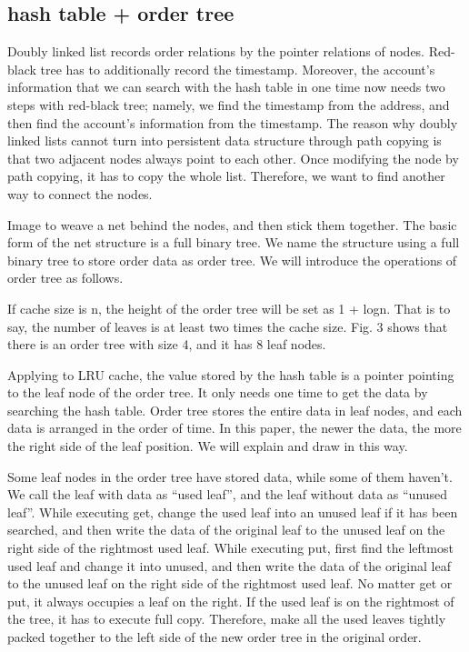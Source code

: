 \documentclass[conference]{IEEEtran}
\begin{document}
\subsection{hash table + order tree}
Doubly linked list records order relations by the pointer relations of nodes. Red-black tree has to additionally record the timestamp. Moreover, the account’s information that we can search with the hash table in one time now needs two steps with red-black tree; namely, we find the timestamp from the address, and then find the account's information from the timestamp.
The reason why doubly linked lists cannot turn into persistent data structure through path copying is that two adjacent nodes always point to each other. Once modifying the node by path copying, it has to copy the whole list. Therefore, we want to find another way to connect the nodes.

Image to weave a net behind the nodes, and then stick them together.
The basic form of the net structure is a full binary tree. We name the structure using a full binary tree to store order data as order tree. We will introduce the operations of order tree as follows.

If cache size is n, the height of the order tree will be set as 1 + logn. That is to say, the number of leaves is at least two times the cache size. Fig. 3 shows that there is an order tree with size 4, and it has 8 leaf nodes.

Applying to LRU cache, the value stored by the hash table is a pointer pointing to the leaf node of the order tree. It only needs one time to get the data by searching the hash table. 
Order tree stores the entire data in leaf nodes, and each data is arranged in the order of time. In this paper, the newer the data, the more the right side of the leaf position. We will explain and draw in this way.

Some leaf nodes in the order tree have stored data, while some of them haven’t. We call the leaf with data as “used leaf”, and the leaf without data as “unused leaf”.
While executing get, change the used leaf into an unused leaf if it has been searched, and then write the data of the original leaf to the unused leaf on the right side of the rightmost used leaf. While executing put, first find the leftmost used leaf and change it into unused, and then write the data of the original leaf to the unused leaf on the right side of the rightmost used leaf. No matter get or put, it always occupies a leaf on the right. If the used leaf is on the rightmost of the tree, it has to execute full copy. Therefore, make all the used leaves tightly packed together to the left side of the new order tree in the original order.
\end{document}
